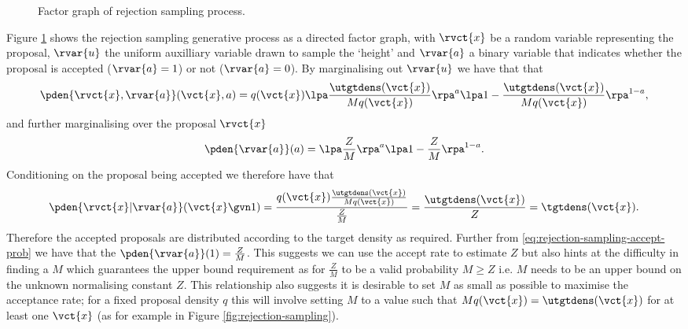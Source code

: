 \begin{figure}[t]
\centering
{}
\caption{Factor graph of rejection sampling process.}
\label{fig:rejection-sampling-factor-graph}
\end{figure}

Figure \ref{fig:rejection-sampling-factor-graph} shows the rejection sampling generative process as a directed factor graph, with $\rvct{x}$ be a random variable representing the proposal, $\rvar{u}$ the uniform auxilliary variable drawn to sample the `height' and $\rvar{a}$ a binary variable that indicates whether the proposal is accepted ($\rvar{a} = 1$) or not ($\rvar{a} = 0$). By marginalising out $\rvar{u}$ we have that that
\begin{equation}\label{eq:rejection-sampling-joint-prob}
  \pden{\rvct{x},\rvar{a}}(\vct{x},a) = 
  q(\vct{x}) \lpa\frac{\utgtdens(\vct{x})}{Mq(\vct{x})}\rpa^a
  \lpa1 - \frac{\utgtdens(\vct{x})}{Mq(\vct{x})}\rpa^{1-a},
\end{equation}
and further marginalising over the proposal $\rvct{x}$
\begin{equation}\label{eq:rejection-sampling-accept-prob}
  \pden{\rvar{a}}(a) = \lpa\frac{Z}{M}\rpa^a \lpa 1 - \frac{Z}{M}\rpa^{1-a}.
\end{equation}
Conditioning on the proposal being accepted we therefore have that
\begin{equation}
  \pden{\rvct{x}|\rvar{a}}(\vct{x}\gvn 1) =
  \frac{q(\vct{x})\frac{\utgtdens(\vct{x})}{Mq(\vct{x})}}{\frac{Z}{M}} = \frac{\utgtdens(\vct{x})}{Z} = \tgtdens(\vct{x}).
\end{equation}
Therefore the accepted proposals are distributed according to the target density as required. Further from \eqref{eq:rejection-sampling-accept-prob} we have that the $\pden{\rvar{a}}(1) = \frac{Z}{M}$. This suggests we can use the accept rate to estimate $Z$ but also hints at the difficulty in finding a $M$ which guarantees the upper bound requirement as for $\frac{Z}{M}$ to be a valid probability $M \geq Z$ i.e. $M$ needs to be an upper bound on the unknown normalising constant $Z$. This relationship also suggests it is desirable to set $M$ as small as possible to maximise the acceptance rate; for a fixed proposal density $q$ this will involve setting $M$ to a value such that $M q(\vct{x}) = \utgtdens(\vct{x})$ for at least one $\vct{x}$ (as for example in Figure \ref{fig:rejection-sampling}).


